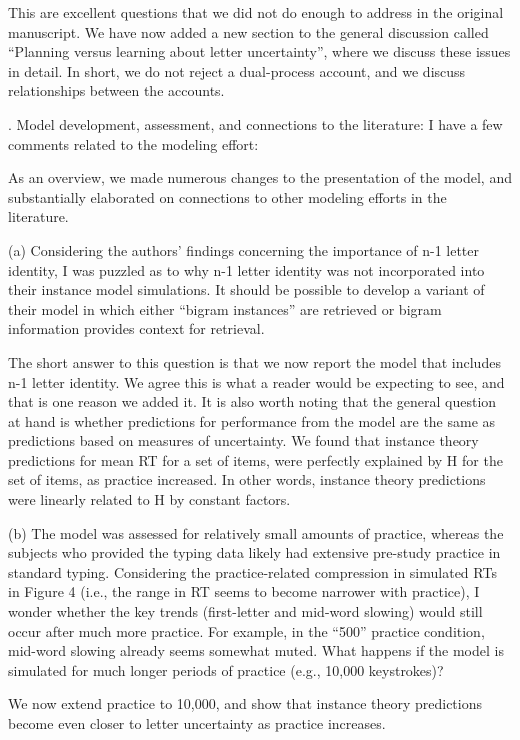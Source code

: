 \documentclass[draft]{article}
\begin{document}
This are excellent questions that we did not do enough to address in the original manuscript. We have now added a new section to the general discussion called ``Planning versus learning about letter uncertainty'', where we discuss these issues in detail. In short, we do not reject a dual-process account, and we discuss relationships between the accounts.

. Model development, assessment, and connections to the literature: I have a few comments related to the modeling effort:

As an overview, we made numerous changes to the presentation of the model, and substantially elaborated on connections to other modeling efforts in the literature.

\RC (a) Considering the authors' findings concerning the importance of n-1 letter identity, I was puzzled as to why n-1 letter identity was not incorporated into their instance model simulations. It should be possible to develop a variant of their model in which either ``bigram instances'' are retrieved or bigram information provides context for retrieval.

The short answer to this question is that we now report the model that includes n-1 letter identity. We agree this is what a reader would be expecting to see, and that is one reason we added it. It is also worth noting that the general question at hand is whether predictions for performance from the model are the same as predictions based on measures of uncertainty. We found that instance theory predictions for mean RT for a set of items, were perfectly explained by H for the set of items, as practice increased. In other words, instance theory predictions were linearly related to H by constant factors.

\RC (b) The model was assessed for relatively small amounts of practice, whereas the subjects who provided the typing data likely had extensive pre-study practice in standard typing. Considering the practice-related compression in simulated RTs in Figure 4 (i.e., the range in RT seems to become narrower with practice), I wonder whether the key trends (first-letter and mid-word slowing) would still occur after much more practice. For example, in the ``500'' practice condition, mid-word slowing already seems somewhat muted. What happens if the model is simulated for much longer periods of practice (e.g., 10,000 keystrokes)?

We now extend practice to 10,000, and show that instance theory predictions become even closer to letter uncertainty as practice increases.
\end{document}
